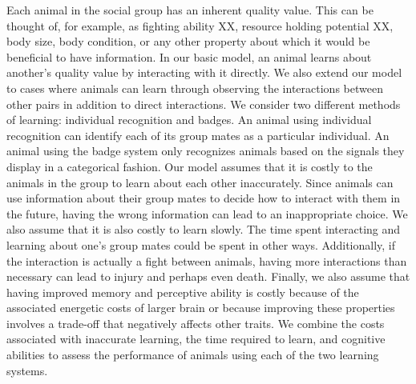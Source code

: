 Each animal in the social group has an inherent quality value. This can be thought of, for example, as fighting ability XX, resource holding potential XX, body size, body condition, or any other property about which it would be beneficial to have information. In our basic model, an animal learns about another's quality value by interacting with it directly. We also extend our model to cases where animals can learn through observing the interactions between other pairs in addition to direct interactions. We consider two different methods of learning: individual recognition and badges. An animal using individual recognition can identify each of its group mates as a particular individual. An animal using the badge system only recognizes animals based on the signals they display in a categorical fashion. Our model assumes that it is costly to the animals in the group to learn about each other inaccurately. Since animals can use information about their group mates to decide how to interact with them in the future, having the wrong information can lead to an inappropriate choice. We also assume that it is also costly to learn slowly. The time spent interacting and learning about one's group mates could be spent in other ways. Additionally, if the interaction is actually a fight between animals, having more interactions than necessary can lead to injury and perhaps even death. Finally, we also assume that having improved memory and perceptive ability is costly because of the associated energetic costs of larger brain or because improving these properties involves a trade-off that negatively affects other traits. We combine the costs associated with inaccurate learning, the time required to learn, and cognitive abilities to assess the performance of animals using each of the two learning systems. 

